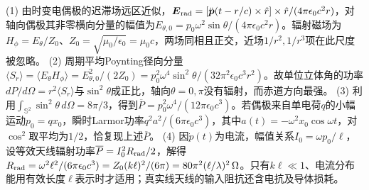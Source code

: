 (1) 由时变电偶极的迟滞场远区近似，\(\boldsymbol E_{\rm rad}=[\ddot{\boldsymbol p}(t-r/c)\times\hat r]\times\hat r/(4\pi\epsilon_0c^2r)\)，对轴向偶极其非零横向分量的幅值为\(E_{\theta,0}=p_0\omega^2\sin\theta/(4\pi\epsilon_0c^2r)\)。辐射磁场为\(H_\phi=E_\theta/Z_0\)、\(Z_0=\sqrt{\mu_0/\epsilon_0}=\mu_0c\)，两场同相且正交，近场\(1/r^2,1/r^3\)项在此尺度被忽略。
(2) 周期平均Poynting径向分量\(\langle S_r\rangle=\langle E_\theta H_\phi\rangle=E_{\theta,0}^2/(2Z_0)=p_0^2\omega^4\sin^2\theta/(32\pi^2\epsilon_0c^3r^2)\)。故单位立体角的功率\(dP/d\Omega=r^2\langle S_r\rangle\)与\(\sin^2\theta\)成正比，轴向\(\theta=0,\pi\)没有辐射，而赤道方向最强。
(3) 利用\(\int_{\mathbb S^2}\sin^2\theta\,d\Omega=8\pi/3\)，得到\(\overline P=p_0^2\omega^4/(12\pi\epsilon_0c^3)\)。若偶极来自单电荷\(q\)的小幅运动\(p_0=qx_0\)，瞬时Larmor功率\(q^2a^2/(6\pi\epsilon_0c^3)\)，其中\(a(t)=-\omega^2x_0\cos\omega t\)，对\(\cos^2\)取平均为\(1/2\)，恰复现上述\(\overline P\)。
(4) 因\(\dot p(t)\)为电流，幅值关系\(I_0=\omega p_0/\ell\)，设等效天线辐射功率\(\overline P=I_0^2R_{\rm rad}/2\)，解得\(R_{\rm rad}=\omega^2\ell^2/(6\pi\epsilon_0c^3)=Z_0(k\ell)^2/(6\pi)=80\pi^2(\ell/\lambda)^2\,\Omega\)。只有\(k\ell\ll1\)、电流分布能用有效长度\(\ell\)表示时才适用；真实线天线的输入阻抗还含电抗及导体损耗。
